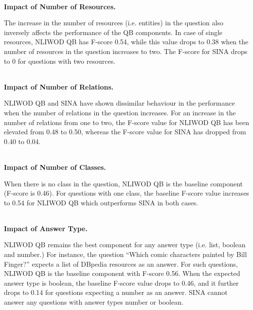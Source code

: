 \documentclass[sigconf,edbt]{acmart-edbt2019}
\newcommand{\qq}[1]{``#1''}
\begin{document}
~\\
{\bf Impact of Number of Resources.} \begin{inparaenum}
The increase in the number of resources (i.e. entities) in the question also inversely affects the performance of the QB components. In case of single resources, NLIWOD QB has F-score 0.54, while this value drops to 0.38 when the number of resources in the question increases to two. The F-score for SINA drops to 0 for questions with two resources.
\end{inparaenum}
~\\
{\bf Impact of Number of Relations.} \begin{inparaenum}
NLIWOD QB and SINA have shown dissimilar behaviour in the performance when the number of relations in the question increases. For an increase in the number of relations from one to two, the F-score value for NLIWOD QB has been elevated from 0.48 to 0.50, whereas the F-score value for SINA has dropped from 0.40 to 0.04.
\end{inparaenum}
~\\
{\bf Impact of Number of Classes.} \begin{inparaenum}
When there is no class in the question, NLIWOD QB is the baseline component (F-score is 0.46). For questions with one class, the baseline F-score value increases to 0.54 for NLIWOD QB which outperforms SINA in both cases.
\end{inparaenum}
~\\
{\bf Impact of Answer Type.} \begin{inparaenum}
NLIWOD QB remains the best component for any answer type (i.e. list, boolean and number.)
For instance, the question \qq{Which comic characters painted by Bill Finger?} expects a list of DBpedia resources as an answer. For such questions, NLIWOD QB is the baseline component with F-score 0.56. When the expected answer type is boolean, the baseline F-score value drops to 0.46, and it further drops to 0.14 for questions expecting a number as an answer. SINA cannot answer any questions with answer types number or boolean.
\end{inparaenum}
\end{document}
